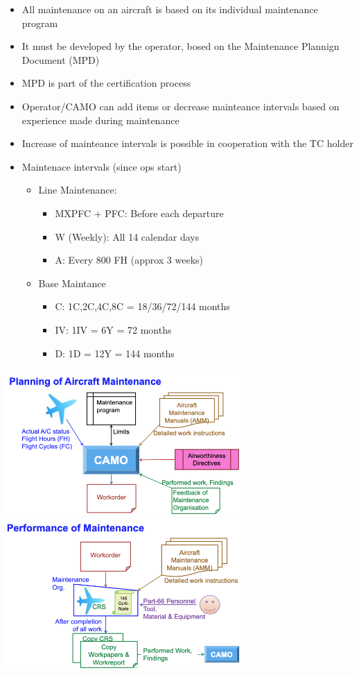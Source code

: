 \documentclass[9pt, landscape, fleqn]{scrartcl}
\begin{document}
\begin{multicols*}{3}
\begin{itemize}
    \item All maintenance on an aircraft is based on its individual maintenance program 
    \item It must be developed by the operator, bosed on the Maintenance Plannign Document (MPD)
    \item MPD is part of the certification process 
    \item Operator/CAMO can add items or decrease mainteance intervals based on experience made during maintenance
    \item Increase of mainteance intervals is possible in cooperation with the TC holder 
    \item Maintenace intervals (since ops start)
    \begin{itemize}
        \item Line Maintenance:
        \begin{itemize}
            \item MXPFC + PFC: Before each departure 
            \item W (Weekly): All 14 calendar days 
            \item A: Every 800 FH (approx 3 weeks)
        \end{itemize}
        \item Base Maintance
        \begin{itemize}
            \item C: 1C,2C,4C,8C = 18/36/72/144 months 
            \item IV: 1IV = 6Y = 72 months 
            \item D: 1D = 12Y = 144 months
        \end{itemize}
    \end{itemize}
\end{itemize}
\begin{center}
    \includegraphics[width=9cm]{Images/Planning of Aircraft Maintenance.png}
    \includegraphics[width=9cm]{Images/Performance of Maintenance.png}

\end{center}
\end{multicols*}
\end{document}
